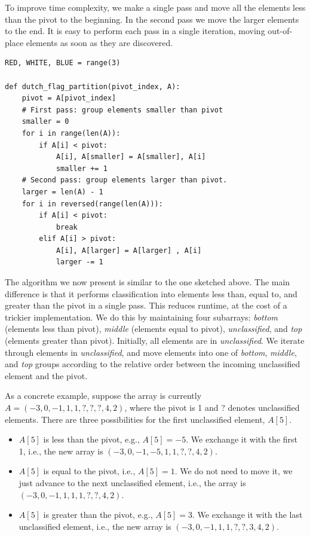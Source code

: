 \documentclass[11pt,a4paper]{article}
\begin{document}
To improve time complexity, we make a single pass and move all the elements
less than the pivot to the beginning. In the second pass we move the larger
elements to the end. It is easy to perform each pass in a single iteration,
moving out-of-place elements as soon as they are discovered.

\begin{verbatim}
RED, WHITE, BLUE = range(3)

def dutch_flag_partition(pivot_index, A):
    pivot = A[pivot_index]
    # First pass: group elements smaller than pivot
    smaller = 0
    for i in range(len(A)):
        if A[i] < pivot:
            A[i], A[smaller] = A[smaller], A[i] 
            smaller += 1
    # Second pass: group elements larger than pivot.
    larger = len(A) - 1
    for i in reversed(range(len(A))):
        if A[i] < pivot: 
            break
        elif A[i] > pivot:
            A[i], A[larger] = A[larger] , A[i]
            larger -= 1
\end{verbatim}

The algorithm we now present is similar to the one sketched above. The main
difference is that it performs classification into elements less than, equal
to, and greater than the pivot in a single pass. This reduces runtime, at the
cost of a trickier implementation. We do this by maintaining four subarrays:
\emph{bottom} (elements less than pivot), \emph{middle} (elements equal to
pivot), \emph{unclassified}, and \emph{top} (elements greater than pivot).
Initially, all elements are in \emph{unclassified}. We iterate through
elements in \emph{unclassified}, and move elements into one of \emph{bottom},
\emph{middle}, and \emph{top} groups according to the relative order between
the incoming unclassified element and the pivot.

As a concrete example, suppose the array is currently $A =
(-3,0,-1,1,1,?,?,?,4,2)$, where the pivot is 1 and ? denotes unclassified
elements. There are three possibilities for the first unclassified element,
$A[5]$.
\begin{itemize}
  \item $A[5]$ is less than the pivot, e.g., $A[5] = -5$. We exchange it with
    the first 1, i.e., the new array is $(-3, 0, -1, -5, 1, 1, ?, ?, 4, 2)$. 
  \item $A[5]$ is equal to the pivot, i.e., $A[5] = 1$. We do not need to move
    it, we just advance to the next unclassified element, i.e., the array is
    $(-3,0,-1,1,1,1,?,?,4,2)$. 
  \item $A[5]$ is greater than the pivot, e.g., $A[5] = 3$. We exchange it 
    with the last unclassified element, i.e., the new array is 
    $(-3,0,-1,1,1,?,?,3,4,2)$. 
\end{itemize}
    
\end{document}
